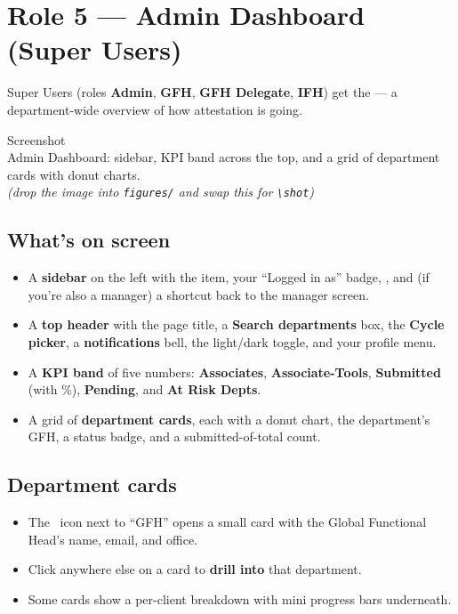 \documentclass[11pt]{article}
\newcommand{\shotph}[1]{%
  \begin{center}
  \begin{tcolorbox}[enhanced, colback=soft, colframe=brand, boxrule=0pt,
       arc=4pt, left=8pt, right=8pt, top=20pt, bottom=20pt, width=\linewidth,
       borderline={0.6pt}{0pt}{brand, dashed}]
    \centering
    {\color{brand}\faImage\;\large Screenshot}\\[5pt]
    {\footnotesize\color{muted} #1}\\[3pt]
    {\scriptsize\color{muted}\itshape (drop the image into \texttt{figures/} and swap this for \texttt{{\textbackslash}shot})}
  \end{tcolorbox}
  \end{center}}
\newcommand{\role}[1]{{\color{brandDark}\bfseries #1}}
\begin{document}
\section{Role 5 --- Admin Dashboard (Super Users)}

Super Users (roles \role{Admin}, \role{GFH}, \role{GFH Delegate}, \role{IFH}) get
the  --- a department-wide overview of how attestation is
going.

\shotph{Admin Dashboard: sidebar, KPI band across the top, and a grid of department cards with donut charts.}

\subsection{What's on screen}
\begin{itemize}[leftmargin=1.4em]
  \item A \textbf{sidebar} on the left with the  item, your
        ``Logged in as'' badge, , and (if you're also a manager) a
         shortcut back to the manager screen.
  \item A \textbf{top header} with the page title, a \textbf{Search departments}
        box, the \textbf{Cycle picker}, a \textbf{notifications} bell, the
        light/dark toggle, and your profile menu.
  \item A \textbf{KPI band} of five numbers: \textbf{Associates},
        \textbf{Associate-Tools}, \textbf{Submitted} (with \%),
        \textbf{Pending}, and \textbf{At Risk Depts}.
  \item A grid of \textbf{department cards}, each with a donut chart, the
        department's GFH, a status badge, and a submitted-of-total count.
\end{itemize}

\subsection{Department cards}
\begin{itemize}[leftmargin=1.4em]
  \item The \faInfoCircle\ icon next to ``GFH'' opens a small card with the Global
        Functional Head's name, email, and office.
  \item Click anywhere else on a card to \textbf{drill into} that department.
  \item Some cards show a per-client breakdown with mini progress bars underneath.
\end{itemize}
\end{document}
